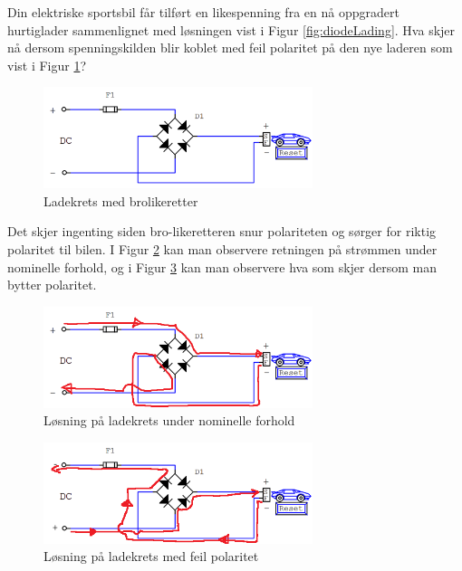\begin{question}[name=Oppgave, topic=dioder]
	Din elektriske sportsbil får tilført en likespenning fra en nå oppgradert hurtiglader sammenlignet med løsningen vist i Figur \ref{fig:diodeLading}. Hva skjer nå dersom spenningskilden blir koblet med feil polaritet på den nye laderen som vist i Figur \ref{fig:diodeLadingG}?

	\begin{figure}[H]
		\centering
		\includegraphics[width=0.7\textwidth]{diode/figurer/GretzLading.png}
		\caption{Ladekrets med brolikeretter}
		\label{fig:diodeLadingG}
	\end{figure}

\end{question}

\vspace{0.5cm} %

\begin{solution}[name=Løsningsforslag oppgave]
Det skjer ingenting siden bro-likeretteren snur polariteten og sørger for riktig polaritet til bilen. I Figur \ref{fig:BroLadingSol} kan man observere retningen på strømmen under nominelle forhold, og i Figur \ref{fig:BroLadingSol2} kan man observere hva som skjer dersom man bytter polaritet.

\begin{figure}[H]
	\centering
	\includegraphics[width=0.7\textwidth]{diode/figurer/GretzLadingVanlig-SOL.png}
	\caption{Løsning på ladekrets under nominelle forhold}
	\label{fig:BroLadingSol}
\end{figure}

\begin{figure}[H]
	\centering
	\includegraphics[width=0.7\textwidth]{diode/figurer/GretzLadingFeil-SOL.png}
	\caption{Løsning på ladekrets med feil polaritet}
	\label{fig:BroLadingSol2}
\end{figure}


\end{solution}






